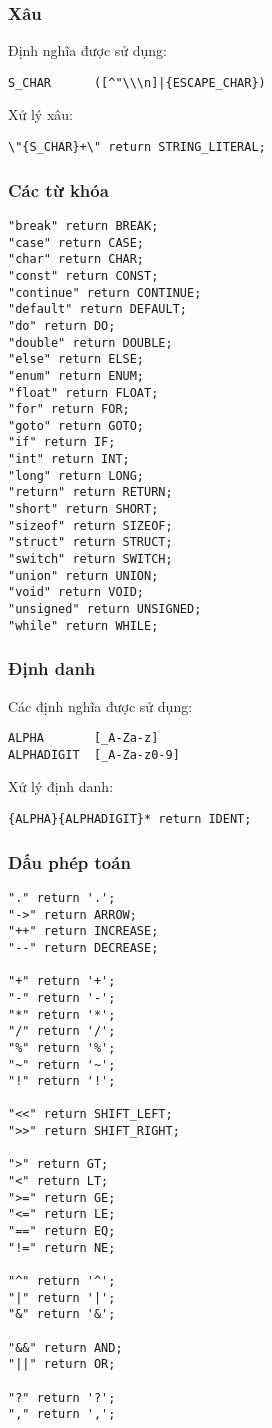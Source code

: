 \documentclass[../report.tex]{subfiles}
\begin{document}
\subsubsection{Xâu}
Định nghĩa được sử dụng: 
\begin{lstlisting}
S_CHAR      ([^"\\\n]|{ESCAPE_CHAR})
\end{lstlisting}
Xử lý xâu:
\begin{lstlisting}
\"{S_CHAR}+\" return STRING_LITERAL;
\end{lstlisting}

\subsubsection{Các từ khóa}
\begin{lstlisting}
"break" return BREAK;
"case" return CASE;
"char" return CHAR;
"const" return CONST;
"continue" return CONTINUE;
"default" return DEFAULT;
"do" return DO;
"double" return DOUBLE;
"else" return ELSE;
"enum" return ENUM;
"float" return FLOAT;
"for" return FOR;
"goto" return GOTO;
"if" return IF;
"int" return INT;
"long" return LONG;
"return" return RETURN;
"short" return SHORT;
"sizeof" return SIZEOF;
"struct" return STRUCT;
"switch" return SWITCH;
"union" return UNION;
"void" return VOID;
"unsigned" return UNSIGNED;
"while" return WHILE;
\end{lstlisting}

\subsubsection{Định danh}
Các định nghĩa được sử dụng: 
\begin{lstlisting}
ALPHA       [_A-Za-z]
ALPHADIGIT  [_A-Za-z0-9]
\end{lstlisting}
Xử lý định danh: 
\begin{lstlisting}
{ALPHA}{ALPHADIGIT}* return IDENT;
\end{lstlisting}

\subsubsection{Dấu phép toán}
\begin{lstlisting}
"." return '.';
"->" return ARROW;
"++" return INCREASE;
"--" return DECREASE;

"+" return '+';
"-" return '-';
"*" return '*';
"/" return '/';
"%" return '%';
"~" return '~';
"!" return '!';

"<<" return SHIFT_LEFT;
">>" return SHIFT_RIGHT;

">" return GT;
"<" return LT;
">=" return GE;
"<=" return LE;
"==" return EQ;
"!=" return NE;

"^" return '^';
"|" return '|';
"&" return '&';

"&&" return AND;
"||" return OR;

"?" return '?';
"," return ',';
\end{lstlisting}
\end{document}
